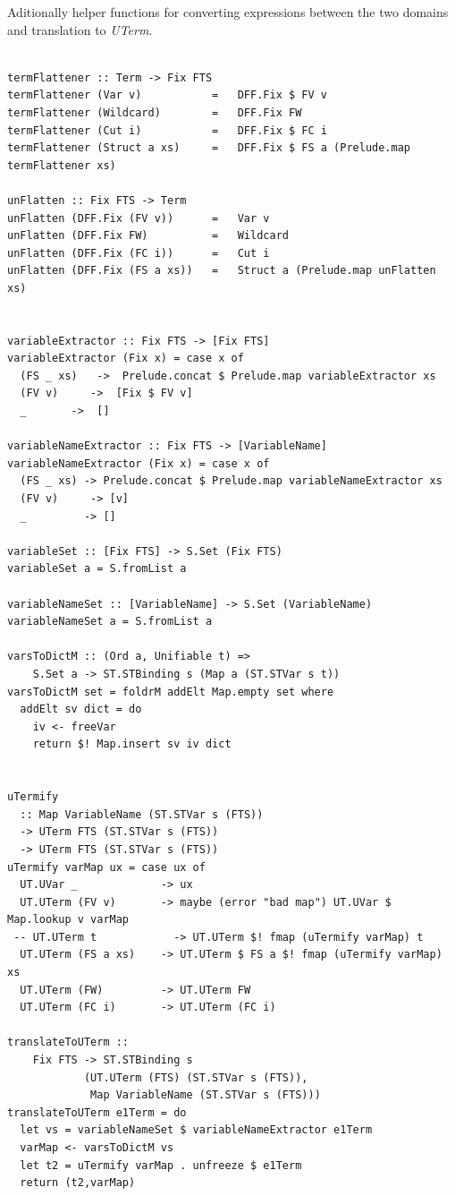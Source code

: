 \documentclass[thesis-solanki.tex]{subfiles}
\begin{document}
Aditionally helper functions for converting expressions between the two domains and translation to \textit{UTerm}.
\begin{verbatim}

termFlattener :: Term -> Fix FTS
termFlattener (Var v)           =   DFF.Fix $ FV v
termFlattener (Wildcard)        =   DFF.Fix FW
termFlattener (Cut i)           =   DFF.Fix $ FC i
termFlattener (Struct a xs)     =   DFF.Fix $ FS a (Prelude.map termFlattener xs)

unFlatten :: Fix FTS -> Term
unFlatten (DFF.Fix (FV v))      =   Var v
unFlatten (DFF.Fix FW)          =   Wildcard
unFlatten (DFF.Fix (FC i))      =   Cut i
unFlatten (DFF.Fix (FS a xs))   =   Struct a (Prelude.map unFlatten xs)


variableExtractor :: Fix FTS -> [Fix FTS]
variableExtractor (Fix x) = case x of
  (FS _ xs)   ->  Prelude.concat $ Prelude.map variableExtractor xs
  (FV v)     ->  [Fix $ FV v]
  _       ->  []

variableNameExtractor :: Fix FTS -> [VariableName]
variableNameExtractor (Fix x) = case x of
  (FS _ xs) -> Prelude.concat $ Prelude.map variableNameExtractor xs
  (FV v)     -> [v]
  _         -> []

variableSet :: [Fix FTS] -> S.Set (Fix FTS)
variableSet a = S.fromList a

variableNameSet :: [VariableName] -> S.Set (VariableName)
variableNameSet a = S.fromList a

varsToDictM :: (Ord a, Unifiable t) =>
    S.Set a -> ST.STBinding s (Map a (ST.STVar s t))
varsToDictM set = foldrM addElt Map.empty set where
  addElt sv dict = do
    iv <- freeVar
    return $! Map.insert sv iv dict


uTermify
  :: Map VariableName (ST.STVar s (FTS))
  -> UTerm FTS (ST.STVar s (FTS))
  -> UTerm FTS (ST.STVar s (FTS))
uTermify varMap ux = case ux of
  UT.UVar _             -> ux
  UT.UTerm (FV v)       -> maybe (error "bad map") UT.UVar $ Map.lookup v varMap
 -- UT.UTerm t            -> UT.UTerm $! fmap (uTermify varMap) t
  UT.UTerm (FS a xs)    -> UT.UTerm $ FS a $! fmap (uTermify varMap) xs
  UT.UTerm (FW)         -> UT.UTerm FW
  UT.UTerm (FC i)       -> UT.UTerm (FC i)

translateToUTerm ::
    Fix FTS -> ST.STBinding s
            (UT.UTerm (FTS) (ST.STVar s (FTS)),
             Map VariableName (ST.STVar s (FTS)))
translateToUTerm e1Term = do
  let vs = variableNameSet $ variableNameExtractor e1Term
  varMap <- varsToDictM vs
  let t2 = uTermify varMap . unfreeze $ e1Term
  return (t2,varMap)



\end{verbatim}
\end{document}
